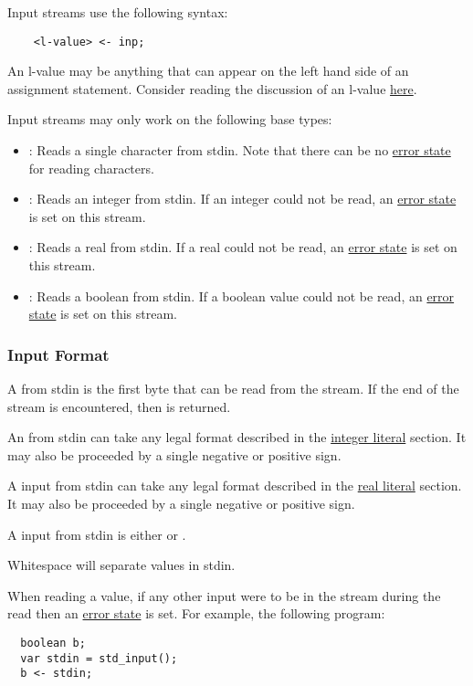 \documentclass[streams.tex]{subfiles}
\begin{document}
Input streams use the following syntax:
\begin{lstlisting}
	<l-value> <- inp;
\end{lstlisting}

An l-value may be anything that can appear on the left hand side of an assignment statement.
Consider reading the discussion of an l-value
\href{https://en.wikipedia.org/wiki/Value_(computer_science)\#Assignment:_l-values_and_r-values}
{here}.

Input streams may only work on the following base types:
\begin{itemize}
	\item
    : Reads a single character from stdin. Note that there can be no
    \hyperref[sssec:stream_error]{error state} for reading characters.
	\item {}:
    Reads an integer from stdin. If an integer could not be read, an \hyperref[sssec:stream_error]
    {error state} is set on this stream.
	\item {}:
    Reads a real from stdin. If a real could not be read, an \hyperref[sssec:stream_error]{error
    state} is set on this stream.
	\item {}:
    Reads a boolean from stdin. If a boolean value could not be read, an
    \hyperref[sssec:stream_error]{error state} is set on this stream.
\end{itemize}

\subsubsection{Input Format}
\label{sssec:input_format}
A  from stdin is the first byte that can be read from the stream. If the end of the
stream is encountered, then  is returned.

An  from stdin can take any legal format described in the \hyperref[sssec:int_lit]
{integer literal} section. It may also be proceeded by a single negative or positive sign.

A  input from stdin can take any legal format described in the \hyperref[sssec:real_lit]
{real literal} section. It may also be proceeded by a single negative or positive sign.

A  input from stdin is either  or .

Whitespace will separate values in stdin.

When reading a value, if any other input were to be in the stream during the read then an
\hyperref[sssec:stream_error]{error state} is set. For example, the following program:
\begin{lstlisting}
  boolean b;
  var stdin = std_input();
  b <- stdin;
\end{lstlisting}
\end{document}
